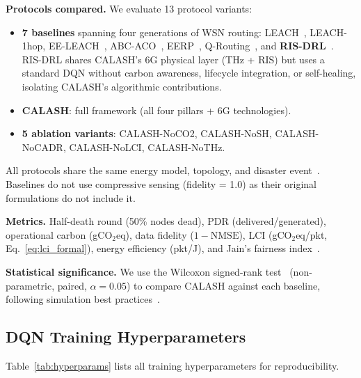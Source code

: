\documentclass[12pt, onecolumn, journal]{IEEEtran}
\begin{document}
\textbf{Protocols compared.}
We evaluate 13 protocol variants:
\begin{itemize}
    \item \textbf{7 baselines} spanning four generations of WSN routing: LEACH~\cite{heinzelman2000leach}, LEACH-1hop, EE-LEACH~\cite{bakaraniya2013eeleach}, ABC-ACO~\cite{elkhediri2024abcaco}, EERP~\cite{biswas2018eerp}, Q-Routing~\cite{boyan1994qrouting, watkins1992qlearning}, and \textbf{RIS-DRL}~\cite{huang2020ris_drl, alhilo2024ris_uav, huang2021ris}.
    RIS-DRL shares CALASH's 6G physical layer (THz + RIS) but uses a standard DQN without carbon awareness, lifecycle integration, or self-healing, isolating CALASH's algorithmic contributions.
    \item \textbf{CALASH}: full framework (all four pillars + 6G technologies).
    \item \textbf{5 ablation variants}: CALASH-NoCO2, CALASH-NoSH, CALASH-NoCADR, CALASH-NoLCI, CALASH-NoTHz.
\end{itemize}
All protocols share the same energy model, topology, and disaster event~\cite{dietrich2009lifetime}.
Baselines do not use compressive sensing (fidelity = 1.0) as their original formulations do not include it.

\textbf{Metrics.}
Half-death round (50\% nodes dead), PDR (delivered/generated), operational carbon (gCO$_2$eq), data fidelity ($1{-}\text{NMSE}$), LCI (gCO$_2$eq/pkt, Eq.~\eqref{eq:lci_formal}), energy efficiency (pkt/J), and Jain's fairness index~\cite{jain1984fairness}.

\textbf{Statistical significance.}
We use the Wilcoxon signed-rank test~\cite{wilcoxon1945} (non-parametric, paired, $\alpha = 0.05$) to compare CALASH against each baseline, following simulation best practices~\cite{law2015simulation, jain1991art}.

\subsection{DQN Training Hyperparameters}
\label{sec:hyperparams}

Table~\ref{tab:hyperparams} lists all training hyperparameters for reproducibility.
\end{document}
